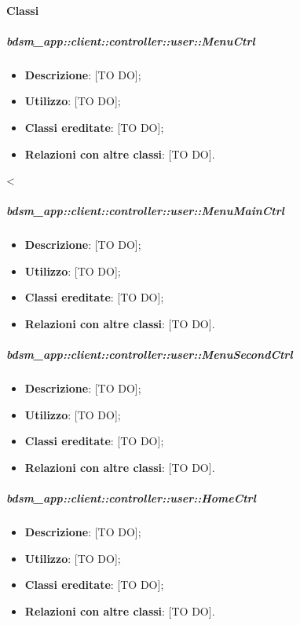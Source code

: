 	\paragraph{Classi} %
		\subparagraph{bdsm\_app::client::controller::user::MenuCtrl} %
		\label{subp:client_controller_user_menuctrl}
			\begin{itemize}
				\item \textbf{Descrizione}: [TO DO];
				\item \textbf{Utilizzo}: [TO DO];
				\item \textbf{Classi ereditate}: [TO DO];
				\item \textbf{Relazioni con altre classi}: [TO DO].
			\end{itemize}<

		\subparagraph{bdsm\_app::client::controller::user::MenuMainCtrl} %
		\label{subp:client_controller_user_menumainctrl}
			\begin{itemize}
				\item \textbf{Descrizione}: [TO DO];
				\item \textbf{Utilizzo}: [TO DO];
				\item \textbf{Classi ereditate}: [TO DO];
				\item \textbf{Relazioni con altre classi}: [TO DO].
			\end{itemize}

		\subparagraph{bdsm\_app::client::controller::user::MenuSecondCtrl} %
		\label{subp:client_controller_user_menusecondctrl}
			\begin{itemize}
				\item \textbf{Descrizione}: [TO DO];
				\item \textbf{Utilizzo}: [TO DO];
				\item \textbf{Classi ereditate}: [TO DO];
				\item \textbf{Relazioni con altre classi}: [TO DO].
			\end{itemize}

		\subparagraph{bdsm\_app::client::controller::user::HomeCtrl} %
		\label{subp:client_controller_user_homectrl}
			\begin{itemize}
				\item \textbf{Descrizione}: [TO DO];
				\item \textbf{Utilizzo}: [TO DO];
				\item \textbf{Classi ereditate}: [TO DO];
				\item \textbf{Relazioni con altre classi}: [TO DO].
			\end{itemize}

